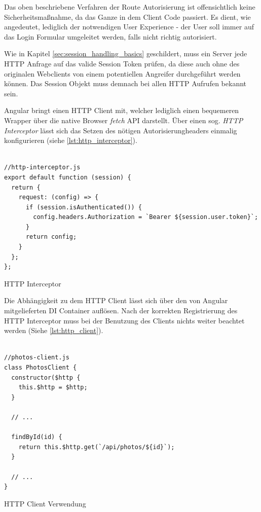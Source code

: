 Das oben beschriebene Verfahren der Route Autorisierung ist offensichtlich keine Sicherheitsmaßnahme, da das Ganze in dem Client Code passiert. Es dient, wie angedeutet, lediglich der notwendigen User Experience - der User soll immer auf das Login Formular umgeleitet werden, falls nicht richtig autorisiert.

Wie in Kapitel \ref{sec:session_handling_basics} geschildert, muss ein Server jede HTTP Anfrage auf das valide Session Token prüfen, da diese auch ohne des originalen Webclients von einem potentiellen Angreifer durchgeführt werden können. Das Session Objekt muss demnach bei allen HTTP Aufrufen bekannt sein.

Angular bringt einen HTTP Client mit, welcher lediglich einen bequemeren Wrapper über die native Browser \textit{fetch} API darstellt. Über einen sog. \textit{HTTP Interceptor} lässt sich das Setzen des nötigen Autorisierungheaders einmalig konfigurieren (siehe \ref{lst:http_interceptor}).

\begin{listing}[H]
\begin{verbatim}

//http-interceptor.js
export default function (session) {
  return {
    request: (config) => {
      if (session.isAuthenticated()) {
        config.headers.Authorization = `Bearer ${session.user.token}`;
      }
      return config;
    }
  };
};

\end{verbatim}
\caption{HTTP Interceptor}
\label{lst:http_interceptor}
\end{listing}

Die Abhängigkeit zu dem HTTP Client lässt sich über den von Angular mitgelieferten DI Container auflösen. Nach der korrekten Registrierung des HTTP Interceptor muss bei der Benutzung des Clients nichts weiter beachtet werden (Siehe \ref{lst:http_client}).

\begin{listing}[H]
\begin{verbatim}

//photos-client.js
class PhotosClient {
  constructor($http {
    this.$http = $http;
  }

  // ...

  findById(id) {
    return this.$http.get(`/api/photos/${id}`);
  }

  // ...
}

\end{verbatim}
\caption{HTTP Client Verwendung}
\label{lst:http_client}
\end{listing}

